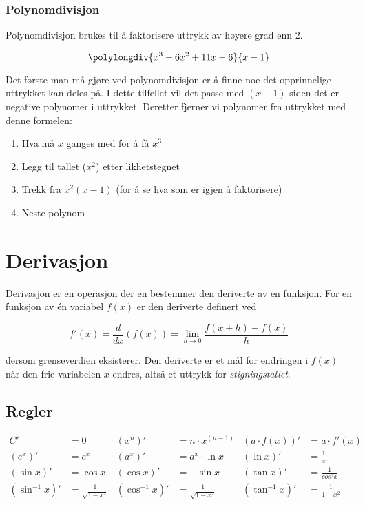 \documentclass[12pt,norsk,a4paper]{article}
\begin{document}
\subsubsection{Polynomdivisjon}
Polynomdivisjon brukes til å faktorisere uttrykk av høyere grad enn 2.

\[  \polylongdiv{x^3-6x^2+11x-6}{x-1}  \]

Det første man må gjøre ved polynomdivisjon er å finne noe det opprinnelige uttrykket kan deles på. I dette tilfellet vil det passe med $(x - 1)$ siden det er negative polynomer i uttrykket. Deretter fjerner vi polynomer fra uttrykket med denne formelen:

\begin{enumerate}
\item Hva må $x$ ganges med for å få $x^3$
\item Legg til tallet ($x^2$) etter likhetstegnet
\item Trekk fra $x^2(x - 1)$ (for å se hva som er igjen å faktorisere)
\item Neste polynom
\end{enumerate}

\newpage










\section{Derivasjon}
Derivasjon er en operasjon der en bestemmer den deriverte av en funksjon. For en funksjon av én variabel $f(x)$ er den deriverte definert ved

\begin{equation}
 f'(x) = \frac{d}{dx}(f(x)) = \lim_{h \to 0} \frac{f(x + h) - f(x)}{h}
\end{equation}

dersom grenseverdien eksisterer. Den deriverte er et mål for endringen i $f(x)$ når den frie variabelen $x$ endres, altså et uttrykk for \textit{stigningstallet}.

\subsection*{Regler}
\begin{align*}
C' &= 0							&	(x^{n})' &= n \cdot x^{(n-1)}	&	(a \cdot f(x))' &= a \cdot f'(x)	\\
(e^{x})' &= e^{x}				&	(a^{x})' &= a^{x} \cdot \ln x	&	(\ln x)' &= \frac{1}{x}				\\
(\sin x)' &= \cos x				&	(\cos x)' &= - \sin x			&	(\tan x)' &= \frac{1}{cos^{2} x}	\\
(\sin^{-1} x) ' &= \frac{1}{\sqrt{1 - x^{2}}}	&	(\cos^{-1} x) ' &= \frac{1}{\sqrt{1 - x^{2}}}	&	(\tan^{-1} x) ' &= \frac{1}{1 - x^{2}}
\end{align*}
\end{document}
